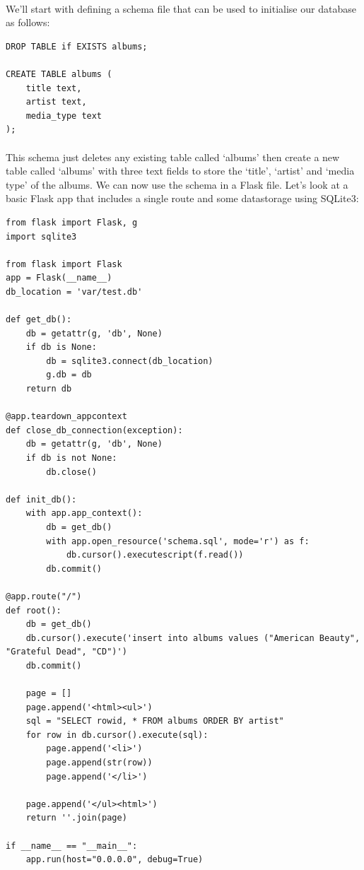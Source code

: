 \documentclass[12pt, a4paper, twoside]{book}
\begin{document}
\paragraph{} We'll start with defining a schema file that can be used to initialise our database as follows:

\begin{lstlisting}
DROP TABLE if EXISTS albums;

CREATE TABLE albums (
    title text,
    artist text,
    media_type text
);
\end{lstlisting}

\paragraph{} This schema just deletes any existing table called `albums' then create a new table called `albums' with three text fields to store the `title', `artist' and `media type' of the albums. We can now use the schema in a Flask file. Let's look at a basic Flask app that includes a single route and some datastorage using SQLite3:

\begin{lstlisting}
from flask import Flask, g
import sqlite3

from flask import Flask
app = Flask(__name__)
db_location = 'var/test.db'

def get_db():
    db = getattr(g, 'db', None)
    if db is None:
        db = sqlite3.connect(db_location)
        g.db = db
    return db

@app.teardown_appcontext
def close_db_connection(exception):
    db = getattr(g, 'db', None)
    if db is not None:
        db.close()

def init_db():
    with app.app_context():
        db = get_db() 
        with app.open_resource('schema.sql', mode='r') as f:
            db.cursor().executescript(f.read())
        db.commit()

@app.route("/")
def root():
    db = get_db()
    db.cursor().execute('insert into albums values ("American Beauty", "Grateful Dead", "CD")')
    db.commit()

    page = []
    page.append('<html><ul>')
    sql = "SELECT rowid, * FROM albums ORDER BY artist"
    for row in db.cursor().execute(sql):
        page.append('<li>')
        page.append(str(row))
        page.append('</li>')

    page.append('</ul><html>')
    return ''.join(page)

if __name__ == "__main__":
    app.run(host="0.0.0.0", debug=True)
\end{lstlisting}
\end{document}
